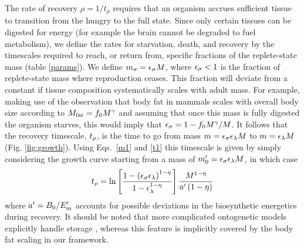 \documentclass[twocolumn,preprintnumbers,amsmath,amssymb,superscriptaddress]{revtex4}
\begin{document}
{The rate of recovery $\rho = 1/t_\rho$ requires that an organism accrues
sufficient tissue to transition from the hungry to the full state.  Since
only certain tissues can be digested for energy (for example the brain cannot
be degraded to fuel metabolism), we define the rates for starvation, death,
and recovery by the timescales required to reach, or return from, specific
fractions of the replete-state mass (table \ref{params}).  We define $m_{\rm \sigma}=\epsilon_{\rm \sigma} M$, where
$\epsilon_{\rm \sigma}<1$ is the fraction of replete-state mass where
reproduction ceases. This fraction will deviate from a constant if tissue
composition systematically scales with adult mass.  For example, making use
of the observation that body fat in mammals scales with overall body size
according to $M_{\rm \rm fat}=f_{\rm 0}M^{\gamma}$ and assuming that once this mass
is fully digested the organism starves, this would imply that
$\epsilon_{\rm \sigma}=1-f_{\rm 0}M^{\gamma}/M$. It follows that the recovery
timescale, $t_{\rm \rho}$, is the time to go from mass
$m=\epsilon_{\rm \sigma} \epsilon_{\rm \lambda} M$ to $m=\epsilon_{\rm \lambda}M$
(Fig. \ref{fig:growth}). Using Eqs.~\eqref{m1} and \eqref{t1} this timescale
is given by simply considering the growth curve starting from a mass of
$m_{\rm 0}^{\prime}=\epsilon_{\rm \sigma}\epsilon_{\rm \lambda}M$, in which case
\begin{eqnarray}
\label{rhotimescale}
t_{\rm \rho}=\ln\left[\frac{1-\left(\epsilon_{\rm \sigma}\epsilon_{\rm \lambda}\right)^{1-\eta}}{1-\epsilon_\lambda^{1-\eta}}\right]\frac{M^{1-\eta}}{a^{\prime}\left(1-\eta\right)}
\end{eqnarray}
where $a^{\prime}=B_{\rm 0}/E_{\rm m}^{\prime}$ accounts for possible deviations in
the biosynthetic energetics during recovery. It should be noted that more complicated ontogenetic models explicitly handle
storage \citep{hou}, whereas this feature is implicitly covered by the body
fat scaling in our framework.



}
\end{document}
